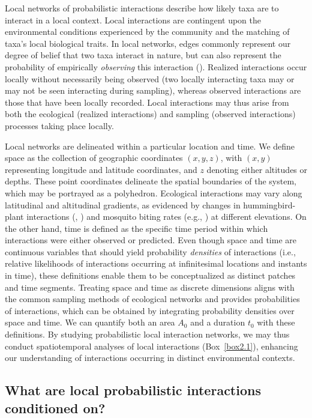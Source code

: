Local networks of probabilistic interactions describe how likely taxa are to
interact in a local context. Local interactions are contingent upon the
environmental conditions experienced by the community and the matching of taxa's
local biological traits. In local networks, edges commonly represent our degree
of belief that two taxa interact in nature, but can also represent the
probability of empirically \textit{observing} this interaction
(\cite{Catchen2023Missinga}). Realized interactions occur locally without
necessarily being observed (two locally interacting taxa may or may not be seen
interacting during sampling), whereas observed interactions are those that have
been locally recorded. Local interactions may thus arise from both the
ecological (realized interactions) and sampling (observed interactions)
processes taking place locally.

Local networks are delineated within a particular location and time. We define
space as the collection of geographic coordinates $(x, y, z)$, with $(x, y)$
representing longitude and latitude coordinates, and $z$ denoting either
altitudes or depths. These point coordinates delineate the spatial boundaries of
the system, which may be portrayed as a polyhedron. Ecological interactions may
vary along latitudinal and altitudinal gradients, as evidenced by changes in
hummingbird-plant interactions (\cite{Weinstein2017Comparing},
\cite{Weinstein2017Persistent}) and mosquito biting rates (e.g.,
\cite{Kulkarni2006Entomological}) at different elevations. On the other hand,
time is defined as the specific time period within which interactions were
either observed or predicted. Even though space and time are continuous
variables that should yield probability \textit{densities} of interactions
(i.e., relative likelihoods of interactions occurring at infinitesimal locations
and instants in time), these definitions enable them to be conceptualized as
distinct patches and time segments. Treating space and time as discrete
dimensions aligns with the common sampling methods of ecological networks and
provides probabilities of interactions, which can be obtained by integrating
probability densities over space and time. We can quantify both an area $A_0$
and a duration $t_0$ with these definitions. By studying probabilistic local
interaction networks, we may thus conduct spatiotemporal analyses of local
interactions (Box~\ref{box2.1}), enhancing our understanding of interactions
occurring in distinct environmental contexts. 

\subsection{What are local probabilistic interactions conditioned on?}

